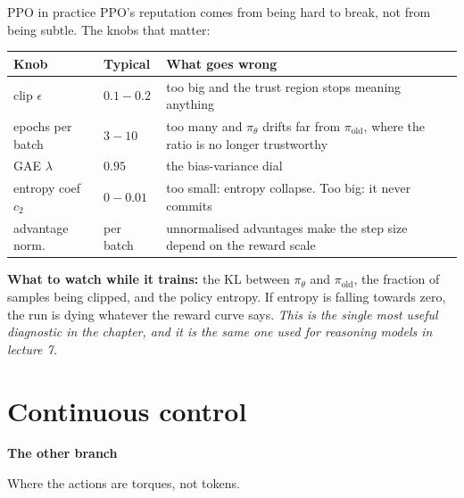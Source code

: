 \documentclass[aspectratio=169]{beamer}
\begin{document}
\begin{frame}{PPO in practice}
  \small
  PPO's reputation comes from being hard to break, not from being subtle. The knobs that matter:

  \vskip 6pt
  \begin{center}
  \footnotesize
  \begin{tabular}{l l l}
    \toprule
    \textbf{Knob} & \textbf{Typical} & \textbf{What goes wrong} \\
    \midrule
    clip $\epsilon$ & $0.1 - 0.2$ & too big and the trust region stops meaning anything \\
    epochs per batch & $3 - 10$ & too many and $\pi_\theta$ drifts far from $\pi_{\text{old}}$,
      where the ratio is no longer trustworthy \\
    GAE $\lambda$ & $0.95$ & the bias-variance dial \\
    entropy coef $c_2$ & $0 - 0.01$ & too small: entropy collapse. Too big: it never commits \\
    advantage norm. & per batch & unnormalised advantages make the step size depend on the
      reward scale \\
    \bottomrule
  \end{tabular}
  \end{center}

  \vskip 8pt
  \begin{tcolorbox}[colback=armorange!12, colframe=armorange, boxrule=0.6pt, arc=2pt]
    \small
    \textbf{What to watch while it trains:} the KL between $\pi_\theta$ and $\pi_{\text{old}}$,
    the fraction of samples being clipped, and the policy entropy. If entropy is falling towards
    zero, the run is dying whatever the reward curve says. \emph{This is the single most useful
    diagnostic in the chapter, and it is the same one used for reasoning models in lecture 7.}
  \end{tcolorbox}
\end{frame}

\section{Continuous control}
\begin{frame}[plain]
  \begin{center}
    \vskip 1.6cm
    {\Huge\bfseries\color{popblue}The other branch}

    \vskip 0.6cm
    {\large Where the actions are torques, not tokens.}
  \end{center}
\end{frame}
\end{document}
